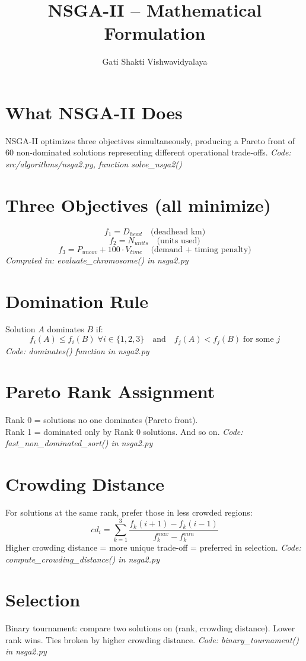 \documentclass{article}
\title{NSGA-II -- Mathematical Formulation}
\author{Gati Shakti Vishwavidyalaya}
\date{}
\begin{document}
\maketitle

\section{What NSGA-II Does}
NSGA-II optimizes three objectives simultaneously, producing a Pareto front
of 60 non-dominated solutions representing different operational trade-offs.
\textit{Code: src/algorithms/nsga2.py, function solve\_nsga2()}

\section{Three Objectives (all minimize)}
\[
  f_1 = D_{head} \quad \text{(deadhead km)}
\]
\[
  f_2 = N_{units} \quad \text{(units used)}
\]
\[
  f_3 = P_{uncov} + 100 \cdot V_{time} \quad \text{(demand + timing penalty)}
\]
\textit{Computed in: evaluate\_chromosome() in nsga2.py}

\section{Domination Rule}
Solution $A$ dominates $B$ if:
\[
  f_i(A) \leq f_i(B) \; \forall i \in \{1,2,3\} \quad \text{and} \quad f_j(A) < f_j(B) \; \text{for some } j
\]
\textit{Code: dominates() function in nsga2.py}

\section{Pareto Rank Assignment}
Rank 0 = solutions no one dominates (Pareto front). \\
Rank 1 = dominated only by Rank 0 solutions. And so on.
\textit{Code: fast\_non\_dominated\_sort() in nsga2.py}

\section{Crowding Distance}
For solutions at the same rank, prefer those in less crowded regions:
\[
  cd_i = \sum_{k=1}^{3} \frac{f_k(i+1) - f_k(i-1)}{f_k^{max} - f_k^{min}}
\]
Higher crowding distance = more unique trade-off = preferred in selection.
\textit{Code: compute\_crowding\_distance() in nsga2.py}

\section{Selection}
Binary tournament: compare two solutions on (rank, crowding distance).
Lower rank wins. Ties broken by higher crowding distance.
\textit{Code: binary\_tournament() in nsga2.py}
\end{document}
